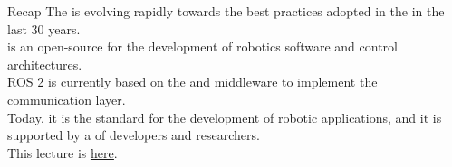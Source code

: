 
\begin{frame}{Recap}
  The  is evolving rapidly towards the best practices adopted in the  in the last 30 years.\\
  \bigskip
   is an open-source  for the development of robotics software and  control architectures.\\
  \bigskip
  ROS 2 is currently based on the  and  middleware to implement the communication layer.\\
  \bigskip
  Today, it is the  standard for the development of robotic applications, and it is supported by a  of developers and researchers.\\
  \bigskip
  \bigskip
  This lecture is \href{https://github.com/robmasocco/DAFN25_Robotics_2}{\color{blue}\underline{here}}.
\end{frame}
